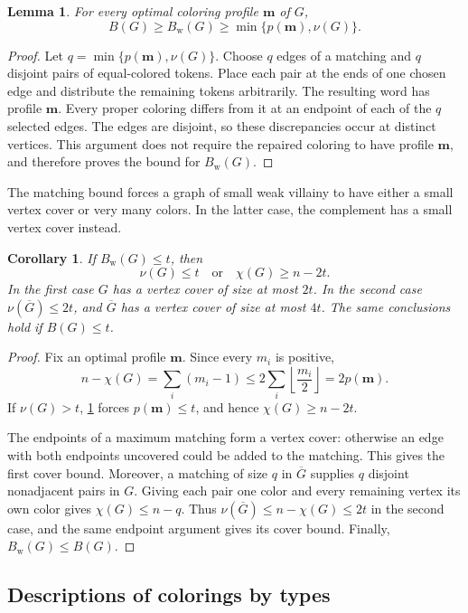 \documentclass[10pt,a4paper]{amsart}
\numberwithin{equation}{section}
\newtheorem{lemma}[theorem]{Lemma}
\newtheorem{corollary}[theorem]{Corollary}
\theoremstyle{definition}
\theoremstyle{remark}
\begin{document}
\begin{lemma}\label{rec:matching}
For every optimal coloring profile $\mathbf m$ of $G$,
\[
B(G)\geq B_{\mathrm w}(G)\geq\min\{p(\mathbf m),\nu(G)\}.
\]
\end{lemma}
\begin{proof}
Let $q=\min\{p(\mathbf m),\nu(G)\}$. Choose $q$ edges of a matching
and $q$ disjoint pairs of equal-colored tokens. Place each pair at the
ends of one chosen edge and distribute the remaining tokens arbitrarily.
The resulting word has profile $\mathbf m$. Every proper coloring
differs from it at an endpoint of each of the $q$ selected edges.
The edges are disjoint, so these discrepancies occur at distinct
vertices. This argument does not require the repaired coloring to
have profile $\mathbf m$, and therefore proves the bound for $B_{\mathrm w}(G)$.
\end{proof}

The matching bound forces a graph of small weak villainy to have
either a small vertex cover or very many colors. In the latter case,
the complement has a small vertex cover instead.

\begin{corollary}\label{rec:dichotomy}
If $B_{\mathrm w}(G)\leq t$, then
\[
\nu(G)\leq t\quad\text{or}\quad\chi(G)\geq n-2t.
\]
In the first case $G$ has a vertex cover of size at most $2t$.
In the second case $\nu(\overline G)\leq 2t$, and
$\overline G$ has a vertex cover of size at most $4t$.
The same conclusions hold if $B(G)\leq t$.
\end{corollary}
\begin{proof}
Fix an optimal profile $\mathbf m$. Since every $m_i$ is positive,
\[
n-\chi(G)=\sum_i(m_i-1)
\leq 2\sum_i\left\lfloor\frac{m_i}{2}\right\rfloor
=2p(\mathbf m).
\]
If $\nu(G)>t$, \cref{rec:matching} forces $p(\mathbf m)\leq t$,
and hence $\chi(G)\geq n-2t$.

The endpoints of a maximum matching form a vertex cover: otherwise
an edge with both endpoints uncovered could be added to the matching.
This gives the first cover bound. Moreover, a matching of size $q$ in
$\overline G$ supplies $q$ disjoint nonadjacent pairs in $G$. Giving
each pair one color and every remaining vertex its own color gives
$\chi(G)\leq n-q$. Thus $\nu(\overline G)\leq n-\chi(G)\leq 2t$
in the second case, and the same endpoint argument gives its cover
bound. Finally, $B_{\mathrm w}(G)\leq B(G)$.
\end{proof}

\subsection{Descriptions of colorings by types}\label{rec:types}
\end{document}
